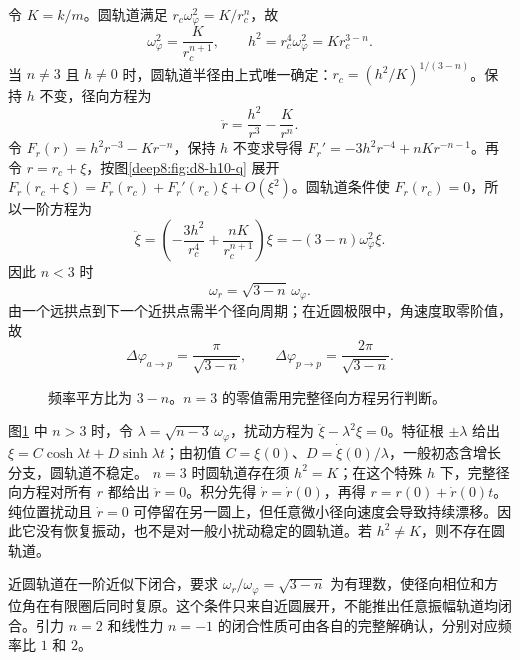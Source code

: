 \begin{solution}
令 $K=k/m$。圆轨道满足 $r_c\omega_\varphi^2=K/r_c^n$，故
\[
 \omega_\varphi^2=\frac K{r_c^{n+1}},\qquad
 h^2=r_c^4\omega_\varphi^2=Kr_c^{3-n}.
\]
当 $n\ne3$ 且 $h\ne0$ 时，圆轨道半径由上式唯一确定：$r_c=(h^2/K)^{1/(3-n)}$。保持 $h$ 不变，径向方程为
\[
 \ddot r=\frac{h^2}{r^3}-\frac K{r^n}.
\]
令 $F_r(r)=h^2r^{-3}-Kr^{-n}$，保持 $h$ 不变求导得 $F_r'=-3h^2r^{-4}+nKr^{-n-1}$。再令 $r=r_c+\xi$，按图\ref{deep8:fig:d8-h10-q} 展开 $F_r(r_c+\xi)=F_r(r_c)+F_r'(r_c)\xi+O(\xi^2)$。圆轨道条件使 $F_r(r_c)=0$，所以一阶方程为
\[
 \ddot\xi=\left(-\frac{3h^2}{r_c^4}+\frac{nK}{r_c^{n+1}}\right)\xi
 =-(3-n)\omega_\varphi^2\xi.
\]
因此 $n<3$ 时
\[
 \boxed{\omega_r=\sqrt{3-n}\,\omega_\varphi}.
\]
由一个远拱点到下一个近拱点需半个径向周期；在近圆极限中，角速度取零阶值，故
\[
 \boxed{\Delta\varphi_{a\to p}=\frac\pi{\sqrt{3-n}}},\qquad
 \Delta\varphi_{p\to p}=\frac{2\pi}{\sqrt{3-n}}.
\]
\begin{figure}[H]\centering
{}
\caption{频率平方比为 $3-n$。$n=3$ 的零值需用完整径向方程另行判断。}\label{deep8:fig:d8-h10-s}
\end{figure}
图\ref{deep8:fig:d8-h10-s} 中 $n>3$ 时，令 $\lambda=\sqrt{n-3}\,\omega_\varphi$，扰动方程为 $\ddot\xi-\lambda^2\xi=0$。特征根 $\pm\lambda$ 给出 $\xi=C\cosh\lambda t+D\sinh\lambda t$；由初值 $C=\xi(0)$、$D=\dot\xi(0)/\lambda$，一般初态含增长分支，圆轨道不稳定。
$n=3$ 时圆轨道存在须 $h^2=K$；在这个特殊 $h$ 下，完整径向方程对所有 $r$ 都给出 $\ddot r=0$。积分先得 $\dot r=\dot r(0)$，再得 $r=r(0)+\dot r(0)t$。纯位置扰动且 $\dot r=0$ 可停留在另一圆上，但任意微小径向速度会导致持续漂移。因此它没有恢复振动，也不是对一般小扰动稳定的圆轨道。若 $h^2\ne K$，则不存在圆轨道。

近圆轨道在一阶近似下闭合，要求 $\omega_r/\omega_\varphi=\sqrt{3-n}$ 为有理数，使径向相位和方位角在有限圈后同时复原。这个条件只来自近圆展开，不能推出任意振幅轨道均闭合。引力 $n=2$ 和线性力 $n=-1$ 的闭合性质可由各自的完整解确认，分别对应频率比 $1$ 和 $2$。
\end{solution}


